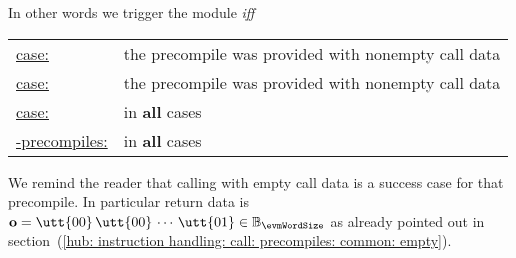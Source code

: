 \saNote{} In other words we trigger the \mmuMod{} module \emph{iff}
\begin{center}
	\renewcommand{\arraystretch}{1.5}
	\begin{tabular}{|ll|}
		\hline
		\underline{\instEcadd{}     case:}     & the precompile was provided with nonempty call data \\
		\underline{\instEcmul{}     case:}     & the precompile was provided with nonempty call data \\
		\underline{\instEcpairing{} case:}     & in \textbf{all} cases                               \\
		\underline{\blsDataMod{}-precompiles:} & in \textbf{all} cases                               \\ \hline
	\end{tabular}
\end{center}
We remind the reader that calling \instEcpairing{} with empty call data is a success case for that precompile.
In particular return data is
$\textbf{o} = \utt{00}\, \utt{00}\, \cdots \, \utt{01} \in \mathbb{B}_{\evmWordSize}$
as already pointed out in
section~(\ref{hub: instruction handling: call: precompiles: common: empty}).
